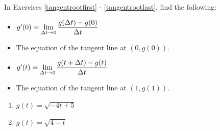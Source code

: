 In Exercises \ref{tangentrootfirst} - \ref{tangentrootlast},  find the following:



\begin{itemize}

\item  $g'(0) = \displaystyle{\lim_{\Delta t \rightarrow 0} \dfrac{g(\Delta t) - g(0)}{\Delta t}}$

\item  The equation of the tangent line at $(0, g(0))$.

\item  $g'(t) =  \displaystyle{\lim_{\Delta t \rightarrow 0} \dfrac{g(t+\Delta t) - g(t)}{\Delta t}}$

\item  The equation of the tangent line at $(1, g(1))$.

\end{itemize}




\begin{multicols}{2}
\begin{enumerate}
\setcounter{enumi}{\value{HW}}

\item\label{tangentrootfirst}  $g(t) = \sqrt{-4t+5}$
\item  \label{tangentrootlast} $g(t) = \sqrt{4-t}$


\setcounter{HW}{\value{enumi}}
\end{enumerate}
\end{multicols}



